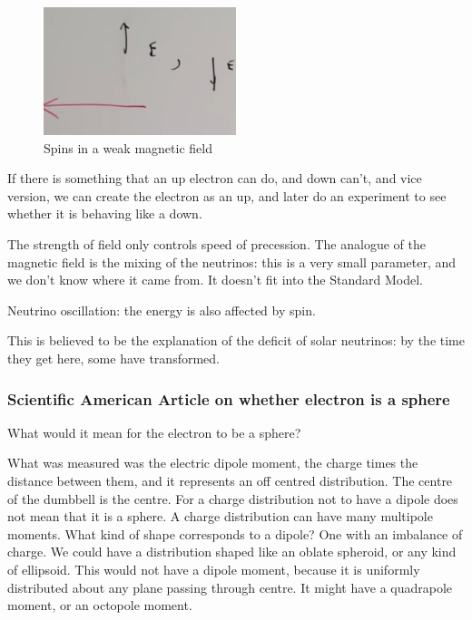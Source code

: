 \documentclass[]{article}
\begin{document}
\begin{figure}[H]
	\begin{center}
		\caption{Spins in a weak magnetic field}\label{fig:aqm-8-spins-lr}
		\includegraphics[width=0.5\textwidth]{aqm-8-spins-lr}
	\end{center}
\end{figure}

If there is something that an up electron can do, and down can't, and vice version, we can create the electron as an up, and later do an experiment to see whether it is behaving like a down.

The strength of field only controls speed of precession. The analogue of the magnetic field is the mixing of the neutrinos: this is a very small parameter, and we don't know where it came from. It doesn't fit into the Standard Model.

Neutrino oscillation: the energy is also affected by spin.

This is believed to be the explanation of the deficit of solar neutrinos: by the time they get here, some have transformed.

\subsubsection{Scientific American Article on whether electron is a sphere}

What would it mean for the electron to be a sphere?\cite{Cartlidge2011Electron}

What was measured was the electric dipole moment, the charge times the distance between them, and it represents an off centred distribution. The centre of the dumbbell is the centre. For a charge distribution not to have a dipole does not mean that it is a sphere. A charge distribution can have many multipole moments. What kind of shape corresponds to a dipole? One with an imbalance of charge. We could have a distribution shaped like an oblate spheroid, or any kind of ellipsoid. This would not have a dipole moment, because it is uniformly distributed about any plane passing through centre. It might have a quadrapole moment, or an octopole moment.
\end{document}
